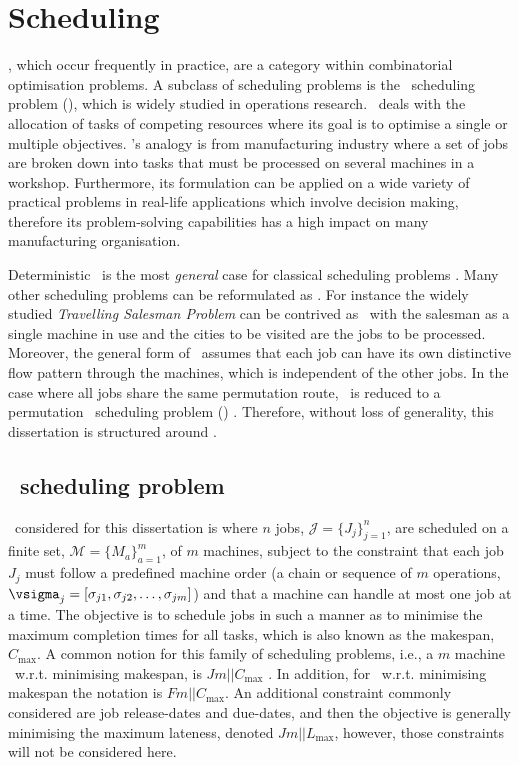 
\chapter{Scheduling}\label{ch:scheduling}
, which occur frequently in practice, are a category within combinatorial optimisation problems. 
A subclass of scheduling problems is the \jsp\ scheduling problem (\JSP), which is widely studied in operations research. 
\Jsp\ deals with the allocation of tasks of competing resources where its goal is to optimise a single or multiple objectives. 
\Jsp's analogy is from manufacturing industry where a set of jobs are broken down into tasks that must be processed on several machines in a workshop. 
Furthermore, its formulation can be applied on a wide variety of practical problems in real-life applications which involve decision making, therefore its problem-solving capabilities has a high impact on many manufacturing organisation. %

Deterministic \JSP\ is the most \emph{general} case for classical scheduling problems \citep{Jain99}. 
Many other scheduling problems can be reformulated as \JSP. 
For instance the widely studied \textit{Travelling Salesman Problem} can be contrived as \jsp\ with the salesman as a single machine in use and the cities to be visited are the jobs to be processed.
Moreover, the general form of \JSP\ assumes that each job can have its own distinctive flow pattern through the machines, which is independent of the other jobs. 
In the case where all jobs share the same permutation route, \jsp\ is reduced to a permutation \fsp\ scheduling problem (\FSP) \citep{Guinet1998,Tay08}. 
Therefore, without loss of generality, this dissertation is structured around \JSP. 

\section{\Jsp\ scheduling problem}
\JSP\ considered for this dissertation is where $n$ jobs, $\mathcal{J}=\{J_j\}_{j=1}^n$, are scheduled on a finite set, $\mathcal{M}=\{M_a\}_{a=1}^m$, of $m$ machines, subject to the constraint that each job $J_j$ must follow a predefined machine order (a chain or sequence of $m$ operations, $\vsigma_j=[\sigma_{j1},\sigma_{j2},\dotsc,\sigma_{jm}]$) and that a machine can handle at most one job at a time. 
The objective is to schedule jobs in such a manner as to minimise the maximum completion times for all tasks, which is also known as the makespan, $C_{\max}$. A common notion for this family of scheduling problems, i.e., a $m$ machine \JSP\ w.r.t. minimising makespan, is $Jm||C_{\max}$ \citep[cf.][]{Pinedo08}. In addition, for \FSP\ w.r.t. minimising makespan the notation is $Fm||C_{\max}$. 
An additional constraint commonly considered are job release-dates and due-dates, and then the objective is generally minimising the maximum lateness, denoted $Jm||L_{\max}$, however, those  constraints will not be considered here. 

